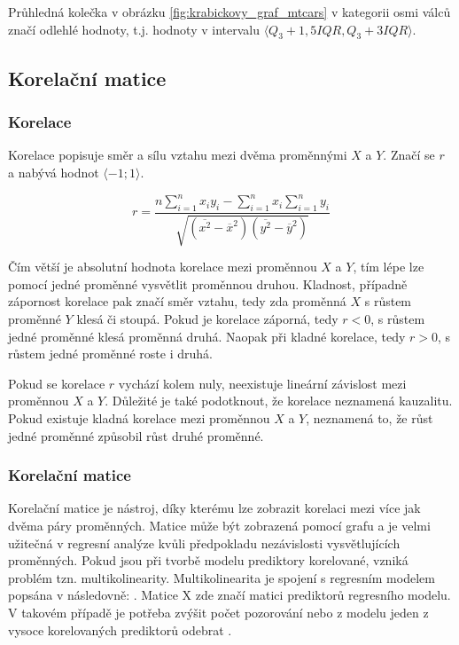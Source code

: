 Průhledná kolečka v obrázku \ref{fig:krabickovy_graf_mtcars} v kategorii osmi válců značí odlehlé hodnoty, t.j. hodnoty
v intervalu $\langle Q_3 + 1,5IQR, Q_3 + 3IQR \rangle$.


\subsection{Korelační matice}
\subsubsection{Korelace}
Korelace popisuje směr a sílu vztahu mezi dvěma proměnnými $X$ a $Y$. Značí se $r$ a nabývá hodnot $\langle -1; 1 \rangle$.

\begin{equation}
r = \frac{n \sum_{i=1}^n x_i y_i - \sum_{i=1}^n x_i \sum_{i=1}^n y_i}
{\sqrt{(\overline{x^2} - \overline{x}^2)(\overline{y^2} - \overline{y}^2)}}
\end{equation}

Čím větší je absolutní hodnota korelace mezi proměnnou $X$ a $Y$, tím lépe lze pomocí jedné proměnné vysvětlit proměnnou druhou. Kladnost, případně zápornost korelace
pak značí směr vztahu, tedy zda proměnná $X$ s růstem proměnné $Y$ klesá či stoupá. Pokud je korelace záporná, tedy $r < 0$, s růstem jedné proměnné klesá proměnná druhá.
Naopak při kladné korelace, tedy $r > 0$, s růstem jedné proměnné roste i druhá.

Pokud se korelace $r$ vychází kolem nuly, neexistuje lineární závislost mezi proměnnou $X$ a $Y$. Důležité je také podotknout, že korelace neznamená kauzalitu. Pokud
existuje kladná korelace mezi proměnnou $X$ a $Y$, neznamená to, že růst jedné proměnné způsobil růst druhé proměnné.  


\subsubsection{Korelační matice}
Korelační matice je nástroj, díky kterému lze zobrazit korelaci mezi více jak dvěma páry proměnných. Matice může být zobrazená pomocí grafu a
je velmi užitečná v regresní analýze kvůli předpokladu nezávislosti vysvětlujících proměnných. Pokud jsou při tvorbě modelu prediktory korelované,
vzniká problém tzn. multikolinearity. Multikolinearita je spojení s regresním modelem popsána v \cite{hebak_regrese_1998} následovně:
.
Matice X zde značí matici prediktorů regresního modelu. V takovém případě je potřeba zvýšit počet pozorování nebo z modelu jeden z vysoce korelovaných prediktorů
odebrat \cite{kleinbaum_logistic_2010}.

